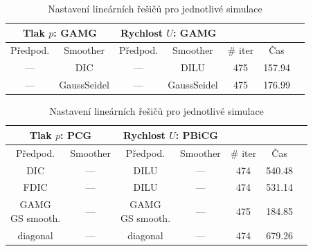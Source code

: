 \documentclass[a4paper,12pt]{report}
\theoremstyle{remark}
\begin{document}
 \begin{table}[H]
	\centering
	\caption{Nastavení lineárních řešičů pro jednotlivé simulace}
	\renewcommand{\arraystretch}{1.9}
	\begin{tabular}{*7c}
		\toprule
		\multicolumn{2}{c}{Tlak $p$: \textbf{GAMG}} & \multicolumn{2}{c}{Rychlost $U$: \textbf{GAMG}}\\		
		\midrule
		Předpod.&Smoother&Předpod.&Smoother&\# iter&Čas\\
		\midrule
 --- & DIC & --- &  DILU & 475 &157.94\\		
 --- & GaussSeidel &  --- & GaussSeidel & 475&176.99\\
		
			\bottomrule
\end{tabular}

\label{table:solvers_GAMG}

\end{table}


\begin{table}[H]
\centering
\caption{Nastavení lineárních řešičů pro jednotlivé simulace}
\renewcommand{\arraystretch}{1.9}
\begin{tabular}{*7c}
\toprule	

\multicolumn{2}{c}{Tlak $p$: \textbf{PCG}} & \multicolumn{2}{c}{Rychlost $U$: \textbf{PBiCG}}\\		
\midrule
Předpod.&Smoother&Předpod.&Smoother&\# iter&Čas\\
\midrule
 DIC & --- &  DILU & --- &474&540.48\\								
FDIC & --- &  DILU & --- &474&531.14\\	
 \shortstack{GAMG\\GS smooth.}& --- &  \shortstack{GAMG\\GS smooth.}& --- &475&184.85\\	
diagonal & --- & diagonal & ---&474&679.26\\	

		\bottomrule
\end{tabular}

\label{table:solvers_PCG}

\end{table}
\end{document}
